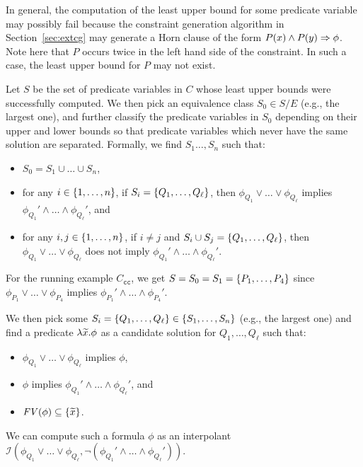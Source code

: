 In general, the computation of the least upper bound for some predicate 
variable may possibly fail because the constraint generation algorithm 
in Section~\ref{sec:extcg} may generate a Horn clause of the form 
\(P(x)\land P(y) \Rightarrow \phi\).  Note here that \(P\) occurs twice in 
the left hand side of the constraint.  In such a case, the least upper 
bound for \(P\) may not exist.

Let \(S\) be the set of predicate variables in \(C\) whose least upper 
bounds were successfully computed.  We then pick an equivalence class 
\(S_0 \in S / E\) (e.g., the largest one), and further classify the 
predicate variables in \(S_0\) depending on their upper and lower bounds 
so that predicate variables which never have the same solution are 
separated.
%
Formally, we find \(S_1\dots,S_n\) such that:
\begin{itemize}
\item \(S_0 = S_1 \cup \dots \cup S_n\),
\item for any \(i \in \{{1,\dots,n}\}\), if \(S_i 
=\{{Q_1,\dots,Q_{\ell}}\}\), then \(\phi_{Q_1} \lor \dots \lor 
\phi_{Q_{\ell}}\) implies \(\phi_{Q_1}' \land \dots \land 
\phi_{Q_{\ell}}'\), and \item for any \(i,j \in \{{1,\dots,n}\}\), if 
\(i \neq j\) and \(S_i \cup S_j = \{{Q_1,\dots,Q_{\ell}}\}\), then 
\(\phi_{Q_1} \lor \dots \lor \phi_{Q_{\ell}}\) does not imply 
\(\phi_{Q_1}' \land \dots \land \phi_{Q_{\ell}}'\).
\end{itemize}
For the running example \(C_{\texttt{cc}}\), we get 
\(S=S_0=S_1=\{{P_1,\dots,P_4}\}\) since \(\phi_{P_1} \lor \dots 
\lor\phi_{P_4}\) implies \(\phi_{P_1}' \land \dots \land \phi_{P_4}'\).

We then pick some \(S_i = \{{Q_1,\dots,Q_{\ell}}\} \in 
\{{S_1,\dots,S_n}\}\) (e.g., the largest one) and find a predicate 
\(\lambda\widetilde{x}.\phi\) as a candidate solution for 
\(Q_1,\dots,Q_{\ell}\) such that:
\begin{itemize}
\item \(\phi_{Q_1} \lor \dots \lor \phi_{Q_{\ell}}\) implies \(\phi\),
\item \(\phi\) implies \(\phi_{Q_1}' \land \dots \land \phi_{Q_{\ell}}'\), and
\item \(\mathit{FV}({\phi}) \subseteq \{{\widetilde{x}}\}\).
\end{itemize}
We can compute such a formula \(\phi\) as an interpolant 
\(\mathcal{I}(\phi_{Q_1} \lor \dots \lor \phi_{Q_{\ell}},\neg 
(\phi_{Q_1}' \land \dots \land \phi_{Q_{\ell}}'))\).

